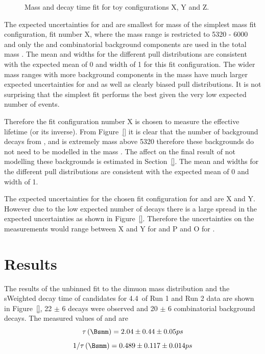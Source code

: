 {\begin{figure}[htbp]
    \caption{Mass and decay time \ml fit for toy configurations X, Y and Z.}
    \label{fig:toyegs}
\end{figure}


The expected uncertainties for \tmumu and \Gmumu are smallest for mass of the simplest mass fit configuration, fit number X, where the mass range is restricted to 5320 - 6000 \mevcc and only the \bsmumu and combinatorial background components are used in the total mass \pdf. The mean and widths for the different pull distributions are consistent with the expected mean of 0 and width of 1 for this fit configuration. The wider mass ranges with more background components in the mass \pdf have much larger expected uncertainties for \tmumu and \Gmumu as well as clearly biased pull distributions. It is not surprising that the simplest fit performs the best given the very low expected number of events. 

Therefore the fit configuration number X is chosen to measure the \bsmumu effective lifetime (or its inverse). From Figure~\ref{} it is clear that the number of background decays from \bdmumu, \bhh and \lambdab is extremely mass above 5320 \mevcc therefore these backgrounds do not need to be modelled in the mass \pdf. The affect on the final result of not modelling these backgrounds is estimated in Section~\ref{}. The mean and widths for the different pull distributions are consistent with the expected mean of 0 and width of 1. 


The expected uncertainties for the chosen fit configuration for \tmumu and \Gmumu are X and Y. However due to the low expected number of decays there is a large spread in the expected uncertainties as shown in Figure~\ref{}. Therefore the uncertainties on the measurements would range between X and Y for \tmumu and P and O for \Gmumu.


\section{Results}
\label{sec:ELresults}

The results of the unbinned \ml fit to the dimuon mass distribution and the sWeighted decay time of \bsmumu candidates for 4.4~\fb of Run 1 and Run 2 data are shown in Figure~\ref{}, 22 $\pm$ 6 \bsmumu decays were observed and 20 $\pm$ 6 combinatorial background decays. The measured values of \tmumu and \Gmumu are
\begin{equation}
\tau\left(\Bsmm\right) = 2.04 \pm 0.44 \pm 0.05 \ps 
\end{equation}
\begin{equation}
1/\tau\left(\Bsmm\right) = 0.489  \pm 0.117  \pm  0.014 \ps
\end{equation}

}
